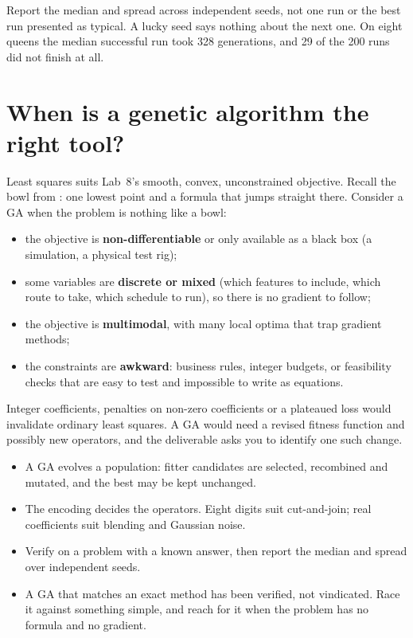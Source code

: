 \begin{pitfall}
Report the median and spread across independent seeds, not one run or the best run presented as typical. A lucky seed says nothing about the next one. On eight queens the median successful run took 328 generations, and 29 of the 200 runs did not finish at all.
\end{pitfall}

\section{When is a genetic algorithm the right tool?}

Least squares suits Lab~8's smooth, convex, unconstrained objective. Recall the bowl from : one lowest point and a formula that jumps straight there. Consider a GA when the problem is nothing like a bowl:

\begin{itemize}
  \item the objective is \textbf{non-differentiable} or only available as a black box (a simulation, a physical test rig);
  \item some variables are \textbf{discrete or mixed} (which features to include, which route to take, which schedule to run), so there is no gradient to follow;
  \item the objective is \textbf{multimodal}, with many local optima that trap gradient methods;
  \item the constraints are \textbf{awkward}: business rules, integer budgets, or feasibility checks that are easy to test and impossible to write as equations.
\end{itemize}

Integer coefficients, penalties on non-zero coefficients or a plateaued loss would invalidate ordinary least squares. A GA would need a revised fitness function and possibly new operators, and the deliverable asks you to identify one such change.

\begin{chapterrecap}
\begin{itemize}
  \item A GA evolves a population: fitter candidates are selected, recombined and mutated, and the best may be kept unchanged.
  \item The encoding decides the operators. Eight digits suit cut-and-join; real coefficients suit blending and Gaussian noise.
  \item Verify on a problem with a known answer, then report the median and spread over independent seeds.
  \item A GA that matches an exact method has been verified, not vindicated. Race it against something simple, and reach for it when the problem has no formula and no gradient.
\end{itemize}
\end{chapterrecap}

